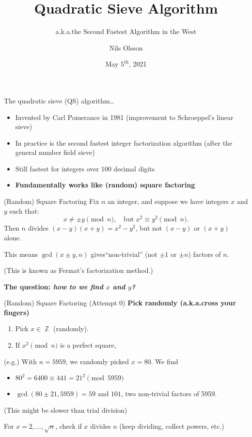 \documentclass[11pt,aspectratio=1610,xcolor=dvipsnames]{beamer}
\title[Quadratic Sieve]{Quadratic Sieve Algorithm}
\subtitle{a.k.a.\@ the Second Fastest Algorithm in the West}
\author{Nils Olsson}
\date{May $5^\text{th}$, 2021}
\DeclareMathOperator{\ZZ}{\mathbb{Z}}
\newcommand{\emphcolor}{Red}
\newcommand{\Emph}[1]{{\color{\emphcolor}\emph{#1}}}
\begin{document}
\begin{frame}
    \titlepage
\end{frame}

\begin{frame}
    The quadratic sieve (QS) algorithm\ldots
    \begin{itemize}
        \item Invented by Carl Pomerance in 1981 (improvement to Schroeppel's linear sieve)
        \item In practice is the second fastest integer factorization algorithm
            (after the general number field sieve)
        \item Still fastest for integers over 100 decimal digits
        \item \textbf{Fundamentally works like (random) square factoring}
    \end{itemize}
\end{frame}

\begin{frame}{(Random) Square Factoring}
    Fix $n$ an integer, and suppose we have integers $x$ and $y$ such that:
    \[
        x\ne \pm y\pmod n, \quad \text{but }
        x^2\equiv y^2 \pmod n.
    \]
    Then
    $n$ divides $(x-y)(x+y) = x^2-y^2$,
    but not $(x-y)$ or $(x+y)$ alone.

    {%
        \color{Blue}
        This means $\gcd(x\pm y,n)$ gives``non-trivial''
        (not $\pm 1$ or $\pm n$) factors of $n$.
    }

    (This is known as Fermat's factorization method.) \pause

    \textbf{The question: \Emph{how to we find $x$ and $y$?}}
\end{frame}

\begin{frame}{(Random) Square Factoring}
    (Attempt 0) \textbf{Pick randomly (a.k.a.\@ cross your fingers)}

    \begin{enumerate}
        \item Pick $x\in\ZZ$ (randomly).
        \item If $x^2\pmod n$ is a perfect square, 
    \end{enumerate} \pause
    (e.g.) With $n=5959$, we randomly  picked $x=80$.
    We find
    \begin{itemize}
        \item ${80}^2 = 6400 \equiv 441 = {21}^2 \pmod{5959}$
        \item $\gcd(80\pm 21,5959)=59\text{ and }101$,
            two non-trivial factors of 5959.
    \end{itemize} \pause
    (This might be slower than trial division)

    For $x=2,\ldots,\sqrt n$, check if $x$ divides $n$
    (keep dividing, collect powers, etc.)
\end{frame}
\end{document}
